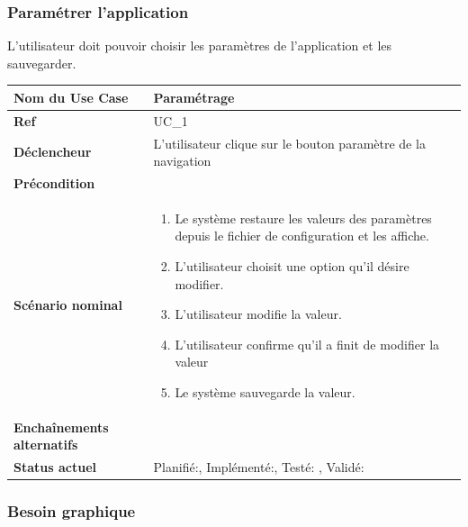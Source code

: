 		\subsubsection{Paramétrer l'application}
			L'utilisateur doit pouvoir choisir les paramètres de l'application et les sauvegarder.\\[0.2cm]
			\begin{longtable}{|l|p{10cm}|}
				\hline \textbf{Nom du Use Case} & Paramétrage \\ 
				\hline \textbf{Ref} & UC\_1  \\ 
				\hline \textbf{Déclencheur} & L'utilisateur clique sur le bouton paramètre de la navigation\\
				\hline \textbf{Précondition} &  \\
				\hline \textbf{Scénario nominal} & 
				\begin{enumerate}
					\item Le système restaure les valeurs des paramètres depuis le fichier de configuration et les affiche.
					\item L'utilisateur choisit une option qu'il désire modifier.
					\item L'utilisateur modifie la valeur.
					\item \label{uc1Mod}L'utilisateur confirme qu'il a finit de modifier la valeur
					\item Le système sauvegarde la valeur.
				\end{enumerate}
				\\ 
				\hline \textbf{Enchaînements alternatifs} &  \\
				\hline \textbf{Status actuel} & Planifié:\CheckedBox , Implémenté:\CheckedBox , Testé: \CheckedBox , Validé: \CheckedBox \\
				\hline 
			\end{longtable} 
		\subsubsection*{Besoin graphique}
		


